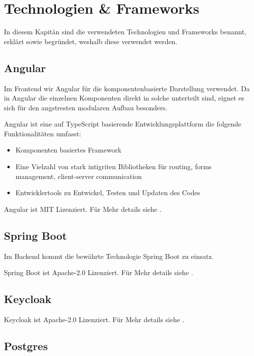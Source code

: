 \chapter{Technologien & Frameworks}

In diesem Kapitän sind die verwendeten Technologien und Frameworks benannt, erklärt
sowie begründet, weshalb diese verwendet werden.

\section{Angular}

Im Frontend wir Angular für die komponentenbasierte Darstellung verwendet.
Da in Angular die einzelnen Komponenten direkt in solche unterteilt sind,
eignet es sich für den angstresten modularen Aufbau besonders.

Angular ist eine auf \gls{TypeScript} basierende Entwicklungsplattform die folgende Funktionalitäten umfasst:
\begin{itemize}
    \item Komponenten basiertes Framework
    \item Eine Vielzahl von stark intigriten Bibliotheken für routing, forms management, client-server communication
    \item Entwicklertools zu Entwickel, Testen und Updaten des Codes
\end{itemize}
\cite{about-angular}

Angular ist MIT Lizenziert.
Für Mehr details siehe .

\section{Spring Boot}

Im Backend kommt die bewährte Technologie Spring Boot zu einsatz.

Spring Boot ist Apache-2.0 Lizenziert.
Für Mehr details siehe .

\section{Keycloak}

Keycloak ist Apache-2.0 Lizenziert.
Für Mehr details siehe .

\section{Postgres}

